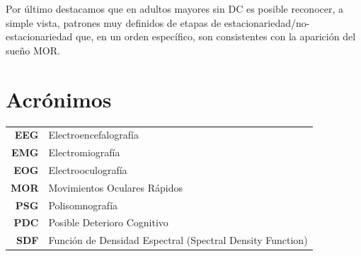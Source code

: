 \documentclass[12pt,a4paper]{mitthesis}
\begin{document}
{Por \'ultimo destacamos que en adultos mayores sin DC es posible reconocer, a simple vista, 
patrones muy definidos de etapas de estacionariedad/no-estacionariedad que, en un orden 
espec\'ifico, son consistentes con la aparici\'on del sue\~no MOR.

}



\chapter*{Acr\'onimos}

\begin{tabular}{rl}
\textbf{EEG} & Electroencefalograf\'ia %
\\
\textbf{EMG} & Electromiograf\'ia %
\\
\textbf{EOG} & Electrooculograf\'ia %
\\
\textbf{MOR} & Movimientos Oculares R\'apidos
\\
\textbf{PSG} & Polisomnograf\'ia %
\\
\textbf{PDC} & Posible Deterioro Cognitivo
\\
\textbf{SDF} & Funci\'on de Densidad Espectral (Spectral Density Function)
\end{tabular}

\newpage


\thispagestyle{empty}

\tableofcontents
\newpage
\end{document}
